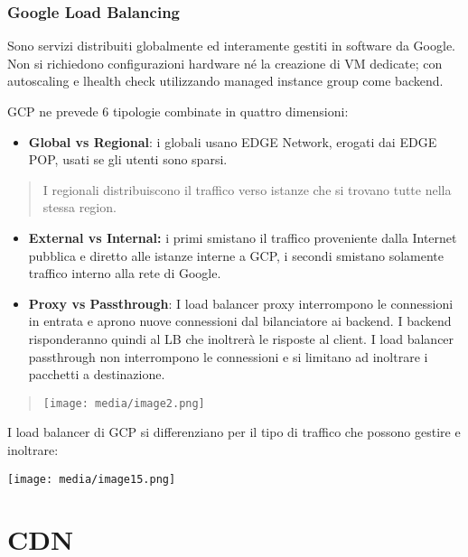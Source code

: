 \subsubsection{Google Load Balancing}\label{google-load-balancing}

Sono servizi distribuiti globalmente ed interamente gestiti in software
da Google. Non si richiedono configurazioni hardware né la creazione di
VM dedicate; con autoscaling e l\textquotesingle health check
utilizzando managed instance group come backend.

GCP ne prevede 6 tipologie combinate in quattro dimensioni:

\begin{itemize}
\item
  \textbf{Global vs Regional}: i globali usano EDGE Network, erogati dai
  EDGE POP, usati se gli utenti sono sparsi.
\end{itemize}

\begin{quote}
I regionali distribuiscono il traffico verso istanze che si trovano
tutte nella stessa region.
\end{quote}

\begin{itemize}
\item
  \textbf{External vs Internal:} i primi smistano il traffico
  proveniente dalla Internet pubblica e diretto alle istanze interne a
  GCP, i secondi smistano solamente traffico interno alla rete di
  Google.
\item
  \textbf{Proxy vs Passthrough}: I load balancer proxy interrompono le
  connessioni in entrata e aprono nuove connessioni dal bilanciatore ai
  backend. I backend risponderanno quindi al LB che inoltrerà le
  risposte al client. I load balancer passthrough non interrompono le
  connessioni e si limitano ad inoltrare i pacchetti a destinazione.
\end{itemize}

\begin{quote}
\texttt{[image: media/image2.png]}
\end{quote}

I load balancer di GCP si differenziano per il tipo di traffico che
possono gestire e inoltrare:

\texttt{[image: media/image15.png]}

\section{CDN}\label{cdn}


